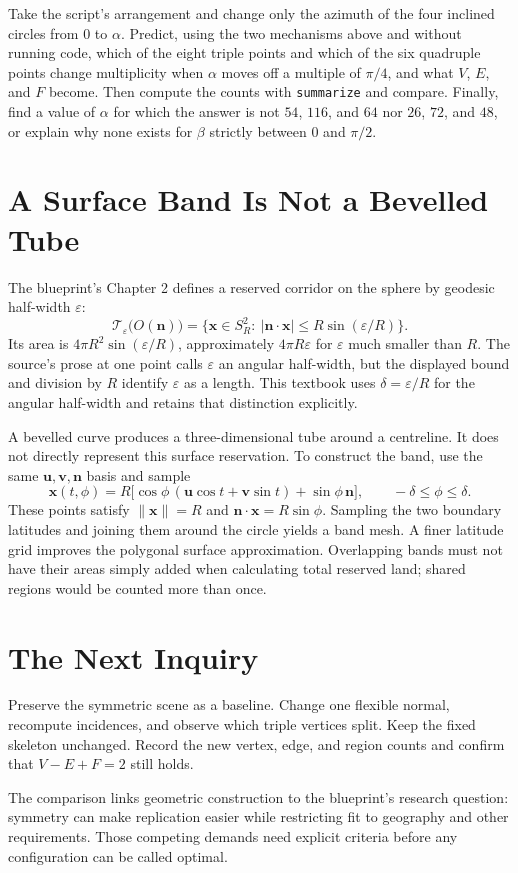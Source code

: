 \begin{exercise}
Take the script's arrangement and change only the azimuth of the four inclined circles from $0$ to $\alpha$. Predict, using the two mechanisms above and without running code, which of the eight triple points and which of the six quadruple points change multiplicity when $\alpha$ moves off a multiple of $\pi/4$, and what $V$, $E$, and $F$ become. Then compute the counts with \texttt{summarize} and compare. Finally, find a value of $\alpha$ for which the answer is not $54$, $116$, and $64$ nor $26$, $72$, and $48$, or explain why none exists for $\beta$ strictly between $0$ and $\pi/2$.
\end{exercise}

\section{A Surface Band Is Not a Bevelled Tube}

The blueprint's Chapter 2 defines a reserved corridor on the sphere by geodesic half-width $\varepsilon$:
\[
  \mathcal T_\varepsilon\bigl(O(\mathbf n)\bigr)=
  \{\mathbf x\in S_R^2:\ |\mathbf n\cdot\mathbf x|\le R\sin(\varepsilon/R)\}.
\]
Its area is $4\pi R^2\sin(\varepsilon/R)$, approximately $4\pi R\varepsilon$ for $\varepsilon$ much smaller than $R$. The source's prose at one point calls $\varepsilon$ an angular half-width, but the displayed bound and division by $R$ identify $\varepsilon$ as a length. This textbook uses $\delta=\varepsilon/R$ for the angular half-width and retains that distinction explicitly.

A bevelled curve produces a three-dimensional tube around a centreline. It does not directly represent this surface reservation. To construct the band, use the same $\mathbf u,\mathbf v,\mathbf n$ basis and sample
\[
  \mathbf x(t,\phi)=R\bigl[\cos\phi\,(\mathbf u\cos t+\mathbf v\sin t)+\sin\phi\,\mathbf n\bigr],
  \qquad -\delta\le\phi\le\delta.
\]
These points satisfy $\|\mathbf x\|=R$ and $\mathbf n\cdot\mathbf x=R\sin\phi$. Sampling the two boundary latitudes and joining them around the circle yields a band mesh. A finer latitude grid improves the polygonal surface approximation. Overlapping bands must not have their areas simply added when calculating total reserved land; shared regions would be counted more than once.

\section{The Next Inquiry}

\begin{exercise}
Preserve the symmetric scene as a baseline. Change one flexible normal, recompute incidences, and observe which triple vertices split. Keep the fixed skeleton unchanged. Record the new vertex, edge, and region counts and confirm that $V-E+F=2$ still holds.

The comparison links geometric construction to the blueprint's research question: symmetry can make replication easier while restricting fit to geography and other requirements. Those competing demands need explicit criteria before any configuration can be called optimal.
\end{exercise}
